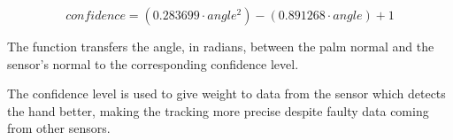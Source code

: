 \begin{equation}
    {confidence = (0.283699 \cdot angle^2)-(0.891268 \cdot angle)+1}
\end{equation}

The function transfers the angle, in radians, between the palm normal and the sensor's normal to the corresponding confidence level. \cite{tomasMultileap}

The confidence level is used to give weight to data from the sensor which detects the hand better, making the tracking more precise despite faulty data coming from other sensors.